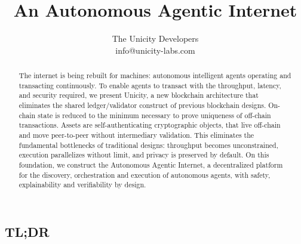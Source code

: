 \documentclass{article}
\title{An Autonomous Agentic Internet}
\author{The Unicity Developers\\info@unicity-labs.com}
\date{}
\begin{document}
\maketitle
\vspace{-3em}

\begin{abstract}

The internet is being rebuilt for machines: autonomous intelligent agents operating and transacting continuously. To enable agents to transact with the throughput, latency, and security required, we present Unicity, a new blockchain architecture that eliminates the shared ledger/validator construct of previous blockchain designs. On-chain state is reduced to the minimum necessary to prove uniqueness of off-chain transactions. Assets are self-authenticating cryptographic objects, that live off-chain and move peer-to-peer without intermediary validation. This eliminates the fundamental bottlenecks of traditional designs: throughput becomes unconstrained, execution parallelizes without limit, and privacy is preserved by default. On this foundation, we construct the Autonomous Agentic Internet, a decentralized platform for the discovery, orchestration and execution of autonomous agents, with safety, explainability and verifiability by design.

\end{abstract}
\vspace{-1em}

\subsection*{TL;DR}
\end{document}
